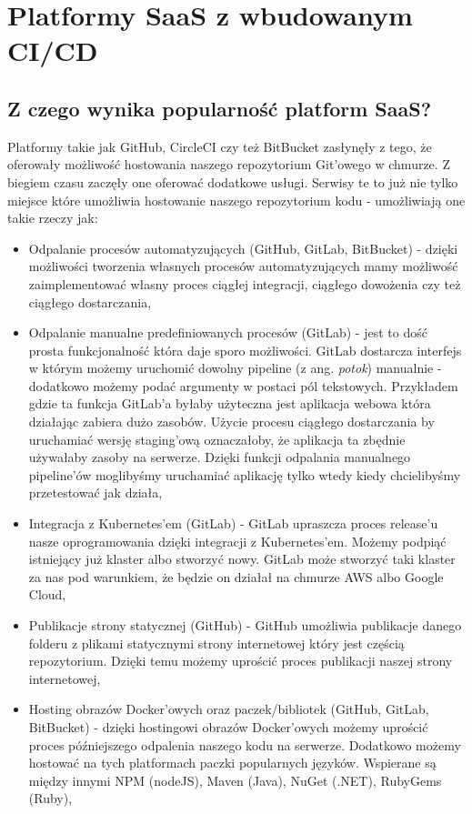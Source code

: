 \section{Platformy SaaS z wbudowanym CI/CD}
\subsection{Z czego wynika popularność platform SaaS?}
Platformy takie jak GitHub, CircleCI czy też BitBucket zasłynęły z tego, że oferowały możliwość hostowania naszego repozytorium Git'owego w chmurze. Z biegiem czasu zaczęły one oferować dodatkowe usługi. Serwisy te to już nie tylko miejsce które umożliwia hostowanie naszego repozytorium kodu - umożliwiają one takie rzeczy jak:
\begin{itemize}
    \item Odpalanie procesów automatyzujących (GitHub, GitLab, BitBucket) - dzięki możliwości tworzenia własnych procesów automatyzujących mamy możliwość zaimplementować własny proces ciągłej integracji, ciągłego dowożenia czy też ciągłego dostarczania,
    \item Odpalanie manualne predefiniowanych procesów (GitLab) - jest to dość prosta funkcjonalność która daje sporo możliwości. GitLab dostarcza interfejs w którym możemy uruchomić dowolny pipeline (z ang. \textit{potok}) manualnie - dodatkowo możemy podać argumenty w postaci pól tekstowych. Przykładem gdzie ta funkcja GitLab'a byłaby użyteczna jest aplikacja webowa która działając zabiera dużo zasobów. Użycie procesu ciągłego dostarczania by uruchamiać wersję staging'ową oznaczałoby, że aplikacja ta zbędnie używałaby zasoby na serwerze. Dzięki funkcji odpalania manualnego pipeline'ów moglibyśmy uruchamiać aplikację tylko wtedy kiedy chcielibyśmy przetestować jak działa,
    \item Integracja z Kubernetes'em (GitLab) - GitLab upraszcza proces release'u nasze oprogramowania dzięki integracji z Kubernetes'em. Możemy podpiąć istniejący już klaster albo stworzyć nowy. GitLab może stworzyć taki klaster za nas pod warunkiem, że będzie on działał na chmurze AWS albo Google Cloud,
    \item Publikacje strony statycznej (GitHub) - GitHub umożliwia publikacje danego folderu z plikami statycznymi strony internetowej który jest częścią repozytorium. Dzięki temu możemy uprościć proces publikacji naszej strony internetowej,
    \item Hosting obrazów Docker'owych oraz paczek/bibliotek (GitHub, GitLab, BitBucket) - dzięki hostingowi obrazów Docker'owych możemy uprościć proces późniejszego odpalenia naszego kodu na serwerze. Dodatkowo możemy hostować na tych platformach paczki popularnych języków. Wspierane są między innymi NPM (nodeJS), Maven (Java), NuGet (.NET), RubyGems (Ruby),

\end{itemize}
